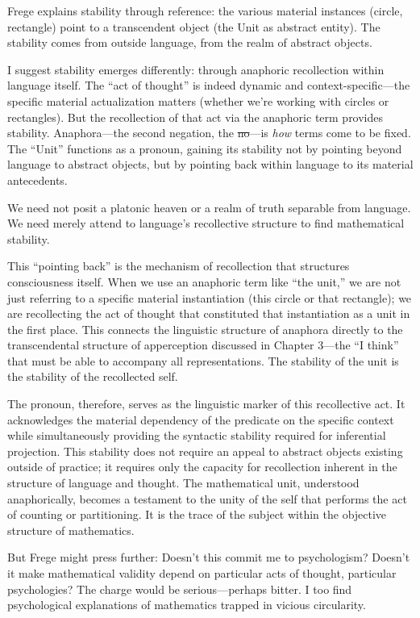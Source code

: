 \documentclass[12pt]{book}
\begin{document}
Frege explains stability through reference: the various material instances (circle, rectangle) point to a transcendent object (the Unit as abstract entity). The stability comes from outside language, from the realm of abstract objects.

I suggest stability emerges differently: through anaphoric recollection within language itself. The ``act of thought'' is indeed dynamic and context-specific---the specific material actualization matters (whether we're working with circles or rectangles). But the recollection of that act via the anaphoric term provides stability. Anaphora---the second negation, the \st{no}---is \emph{how} terms come to be fixed. The ``Unit'' functions as a pronoun, gaining its stability not by pointing beyond language to abstract objects, but by pointing back within language to its material antecedents.

We need not posit a platonic heaven or a realm of truth separable from language. We need merely attend to language's recollective structure to find mathematical stability.

This ``pointing back'' is the mechanism of recollection that structures consciousness itself. When we use an anaphoric term like ``the unit,'' we are not just referring to a specific material instantiation (this circle or that rectangle); we are recollecting the act of thought that constituted that instantiation as a unit in the first place. This connects the linguistic structure of anaphora directly to the transcendental structure of apperception discussed in Chapter 3---the ``I think'' that must be able to accompany all representations. The stability of the unit is the stability of the recollected self.

The pronoun, therefore, serves as the linguistic marker of this recollective act. It acknowledges the material dependency of the predicate on the specific context while simultaneously providing the syntactic stability required for inferential projection. This stability does not require an appeal to abstract objects existing outside of practice; it requires only the capacity for recollection inherent in the structure of language and thought. The mathematical unit, understood anaphorically, becomes a testament to the unity of the self that performs the act of counting or partitioning. It is the trace of the subject within the objective structure of mathematics.

But Frege might press further: Doesn't this commit me to psychologism? Doesn't it make mathematical validity depend on particular acts of thought, particular psychologies? The charge would be serious---perhaps bitter. I too find psychological explanations of mathematics trapped in vicious circularity.
\end{document}
